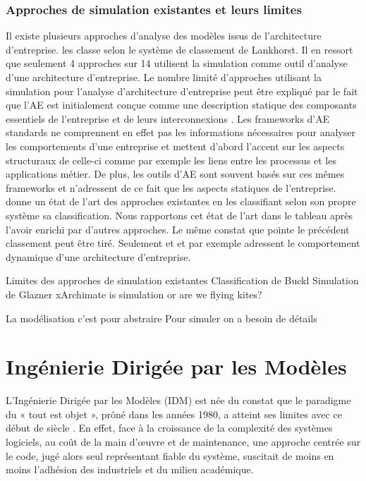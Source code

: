 	\subsubsection{Approches de simulation existantes et leurs limites}
	Il existe plusieurs approches d'analyse des modèles issus de l'architecture d'entreprise. \cite{manzur2015xarchimate} les classe selon le système de classement de Lankhorst. Il en ressort que seulement 4 approches sur 14 utilisent la simulation comme outil d'analyse d'une architecture d'entreprise.
	Le nombre limité d'approches utilisant la simulation pour l'analyse d'architecture d'entreprise peut être expliqué par le fait que l'AE est initialement conçue comme une description statique des composants essentiels de l'entreprise et de leurs interconnexions \cite{hoffman2013enterprise}. Les frameworks d'AE standards ne comprennent en effet pas les informations nécessaires pour analyser les comportements d'une entreprise et mettent d'abord l'accent sur les aspects structuraux de celle-ci comme par exemple les liens entre les processus et les applications métier. De plus, les outils d'AE sont souvent basés sur ces mêmes frameworks et n'adressent de ce fait que les aspects statiques de l'entreprise.
	\cite{buckl2009classifying} donne un état de l'art des approches existantes en les classifiant selon son propre système sa classification. Nous rapportons cet état de l'art dans le tableau après l'avoir enrichi par d'autres approches. Le même constat que pointe le précédent classement peut être tiré. Seulement \cite{de2005enterprise} et \cite{glazner2009simu} et \cite{manzur2015xarchimate} par exemple adressent le comportement dynamique d'une architecture d'entreprise. 
	
	Limites des approches de simulation existantes
	Classification de Buckl
	Simulation de Glazner
	xArchimate
	is simulation or are we flying kites?

 
 

La modélisation c'est pour abstraire
Pour simuler on a besoin de détails



\section{Ingénierie Dirigée par les Modèles}

L'Ingénierie Dirigée par les Modèles (IDM) est née du constat que le paradigme 
du « tout est objet », prôné dans les années 1980, a atteint ses limites avec ce 
début de siècle \cite{greenfield2004software}. En effet, face à la croissance de 
la complexité des systèmes logiciels, au coût de la main d'œuvre et de 
maintenance, une approche centrée sur le code, jugé alors seul représentant 
fiable du système, suscitait de moins en moins l'adhésion des industriels et du 
milieu académique. 

